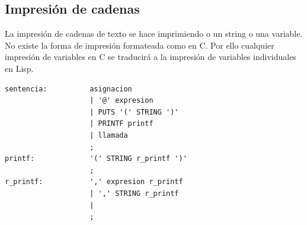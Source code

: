 \documentclass[12pt,a4paper]{article}
\begin{document}
\subsection{Impresión de cadenas}
\noindent La impresión de cadenas de texto se hace imprimiendo o un string o una variable. No existe 
la forma de impresión formateada como en C. Por ello cualquier impresión de variables en C se 
traducirá a la impresión de variables individuales en Lisp.
\begin{lstlisting}
sentencia:          asignacion                                   
                    | '@' expresion                              
                    | PUTS '(' STRING ')'                       
                    | PRINTF printf                            
                    | llamada                                  
                    ;
printf:             '(' STRING r_printf ')'                    
                    ;
r_printf:           ',' expresion r_printf                    
                    | ',' STRING r_printf                      
                    |                                           
                    ;
\end{lstlisting}
\end{document}
